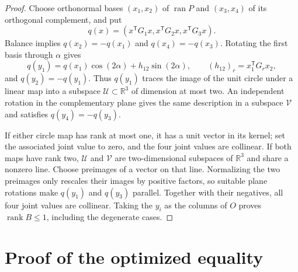 \documentclass[11pt]{article}
\theoremstyle{remark}
\newcommand{\rank}{\operatorname{rank}}
\newcommand{\1}{\mathbb{I}}
\newcommand{\R}{\mathbb{R}}
\begin{document}
\begin{proof}
Choose orthonormal bases $(x_1,x_2)$ of $\operatorname{ran}P$ and
$(x_3,x_4)$ of its orthogonal complement, and put
\begin{equation}
 q(x)=(x^{\mathsf T}G_1x,x^{\mathsf T}G_2x,x^{\mathsf T}G_3x).
\end{equation}
Balance implies $q(x_2)=-q(x_1)$ and $q(x_4)=-q(x_3)$.  Rotating the first
basis through $\alpha$ gives
\begin{equation}
 q(y_1)=q(x_1)\cos(2\alpha)+h_{12}\sin(2\alpha),\qquad
 (h_{12})_r=x_1^{\mathsf T}G_rx_2,
 \label{eq:ellipse}
\end{equation}
and $q(y_2)=-q(y_1)$.  Thus $q(y_1)$ traces the image of the unit circle
under a linear map into a subspace $\mathcal U\subset\R^3$ of dimension at
most two.  An independent rotation in the complementary plane gives the
same description in a subspace $\mathcal V$ and satisfies
$q(y_4)=-q(y_3)$.

If either circle map has rank at most one, it has a unit vector in its
kernel; set the associated joint value to zero, and the four joint values
are collinear.  If both maps have rank two, $\mathcal U$ and $\mathcal V$
are two-dimensional subspaces of $\R^3$ and share a nonzero line.  Choose
preimages of a vector on that line.  Normalizing the two preimages only
rescales their images by positive factors, so suitable plane rotations make
$q(y_1)$ and $q(y_3)$ parallel.  Together with their negatives, all four
joint values are collinear.  Taking the $y_i$ as the columns of $O$ proves
$\rank B\leq1$, including the degenerate cases.
\end{proof}

\section{Proof of the optimized equality}
\label{sec:application}
\end{document}
